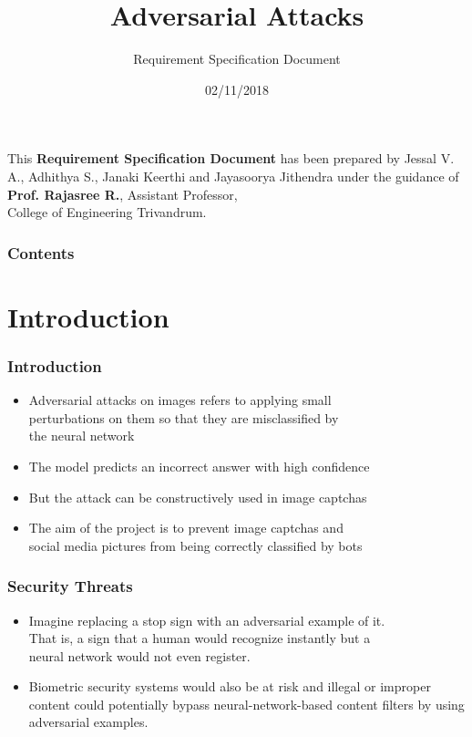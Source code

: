 \documentclass[t,10pt,pdftex]{beamer}
\title[Adversarial Attacks]{Adversarial Attacks }
\author{Requirement Specification Document}
\date{02/11/2018}
\begin{document}
\inserttitlepage

\begin{frame}[c]
\frametitle{}
\vspace{0.5in}
This \textbf{Requirement Specification Document} has been prepared by Jessal V. A., Adhithya S., Janaki Keerthi and Jayasoorya Jithendra under the guidance of \textbf{Prof. Rajasree R.}, Assistant Professor,\\College of Engineering Trivandrum.
\end{frame}


\begin{frame}[c]
	\frametitle{Contents}
	
	\tableofcontents[hideallsubsections]
	
\end{frame}

\AtBeginSection[] {
 \begin{frame}[c]
 \frametitle{}
   \small \tableofcontents[hideallsubsections,sectionstyle=show/shaded,subsectionstyle=hide/hide/hide ]
\end{frame}
}

\section{ Introduction}
\begin{frame}
	\frametitle{Introduction}
	\begin{itemize}
		\item Adversarial attacks on images refers to applying small\\perturbations on them so that they are misclassified by\\the neural network
		\item The model predicts an incorrect answer with high confidence
		\item But the attack can be constructively used in image captchas
		\item The aim of the project is to prevent image captchas and\\social media pictures from being correctly classified by bots
	\end{itemize}
\end{frame}

\begin{frame}
	\frametitle{Security Threats}
	\begin{itemize}
		\item Imagine replacing a stop sign with an adversarial example of it.\\
		That is, a sign that a human would recognize instantly but a\\neural network would not even register.
		\item Biometric security systems would also be at risk and illegal or improper content could potentially bypass neural-network-based content filters by using adversarial examples.
	\end{itemize}
\end{frame}
\end{document}
